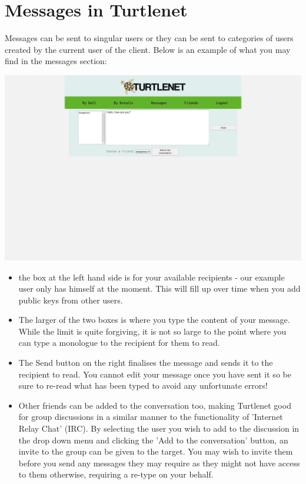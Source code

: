 \pagebreak
\section{Messages in Turtlenet}
Messages can be sent to singular users or they can be sent to categories of
users created by the current user of the client.  Below is an example of what
you may find in the messages section:

\includegraphics[scale=0.2]{../Screenshots/Screenshot from 2014-04-29 22-30-50}

\begin{itemize}
\item the box at the left hand side is for your available recipients - our
      example user only has himself at the moment.  This will fill up over time
      when you add public keys from other users.
\item The larger of the two boxes is where you type the content of your message.
      While the limit is quite forgiving, it is not so large to the point where
      you can type a monologue to the recipient for them to read.
\item The Send button on the right finalises the message and sends it to the
      recipient to read.  You cannot edit your message once you have sent it
      so be sure to re-read what has been typed to avoid any unfortunate errors!
\item Other friends can be added to the conversation too, making Turtlenet good
      for group discussions in a similar manner to the functionality of 
      'Internet Relay Chat' (IRC).  By selecting the user you wish to add to the
      discussion in the drop down menu and clicking the 'Add to the 
      conversation' button, an invite to the group can be given to the target.
      You may wish to invite them before you send any messages they may require
      as they might not have access to them otherwise, requiring a re-type on
      your behalf.
\end{itemize}

